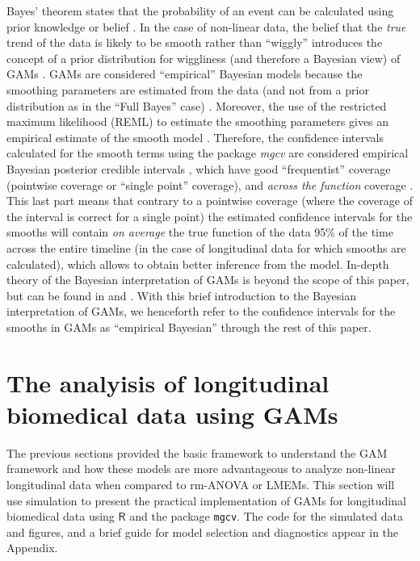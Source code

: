 \documentclass[Royal,times,sagev]{sagej}
\begin{document}
Bayes' theorem states that the probability of an event can be calculated
using prior knowledge or belief \citep{mcelreath2018}. In the case of
non-linear data, the belief that the \emph{true} trend of the data is
likely to be smooth rather than ``wiggly'' introduces the concept of a
prior distribution for wiggliness (and therefore a Bayesian view) of
GAMs \citep{wood2017}. GAMs are considered ``empirical'' Bayesian models
because the smoothing parameters are estimated from the data (and not
from a prior distribution as in the ``Full Bayes'' case)
\citep{miller2019}. Moreover, the use of the restricted maximum
likelihood (REML) to estimate the smoothing parameters gives an
empirical estimate of the smooth model \citep{laird1982, pedersen2019}.
Therefore, the confidence intervals calculated for the smooth terms
using the package \emph{mgcv} are considered empirical Bayesian
posterior credible intervals \citep{pedersen2019}, which have good
``frequentist'' coverage (pointwise coverage or ``single point''
coverage), and \emph{across the function} coverage \citep{wood2017}.
This last part means that contrary to a pointwise coverage (where the
coverage of the interval is correct for a single point) the estimated
confidence intervals for the smooths will contain \emph{on average} the
true function of the data 95\% of the time across the entire timeline
(in the case of longitudinal data for which smooths are calculated),
which allows to obtain better inference from the model. In-depth theory
of the Bayesian interpretation of GAMs is beyond the scope of this
paper, but can be found in \citep{miller2019, wood2017, simpson2018} and
\citep{marra2012}. With this brief introduction to the Bayesian
interpretation of GAMs, we henceforth refer to the confidence intervals
for the smooths in GAMs as ``empirical Bayesian'' through the rest of
this paper.

\hypertarget{longitudinal-GAMs}{%
\section{The analyisis of longitudinal biomedical data using
GAMs}\label{longitudinal-GAMs}}

The previous sections provided the basic framework to understand the GAM
framework and how these models are more advantageous to analyze
non-linear longitudinal data when compared to rm-ANOVA or LMEMs. This
section will use simulation to present the practical implementation of
GAMs for longitudinal biomedical data using \(\textsf{R}\) and the
package \texttt{mgcv}. The code for the simulated data and figures, and
a brief guide for model selection and diagnostics appear in the
Appendix.
\end{document}

